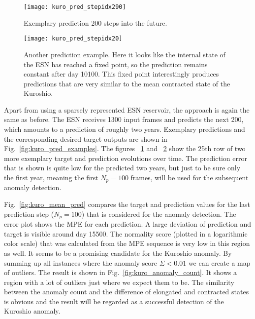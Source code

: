 \begin{figure}[p]
  \centering
  \texttt{[image: kuro\_pred\_stepidx290]}
  \caption{Exemplary prediction 200 steps into the future.}
  \label{fig:kuro_pred_stepidx290}
\end{figure}

\begin{figure}[p]
  \centering
  \texttt{[image: kuro\_pred\_stepidx20]}
  \caption{Another prediction example. Here it looks like the internal state of
  the ESN has reached a fixed point, so the prediction remains constant after
  day 10100.  This fixed point interestingly produces predictions that are very
  similar to the mean contracted state of the Kuroshio.}
  \label{fig:kuro_pred_stepidx20}
\end{figure}



Apart from using a sparsely represented ESN reservoir, the approach is again
the same as before.  The ESN receives 1300 input frames and predicts the next
200, which amounts to a prediction of roughly two years. Exemplary predictions
and the corresponding desired target outputs are shown in
Fig.~\ref{fig:kuro_pred_examples}. The figures ~\ref{fig:kuro_pred_stepidx290}
and ~\ref{fig:kuro_pred_stepidx20} show the 25th row of two more exemplary
target and prediction evolutions over time. The prediction error that is shown
is quite low for the predicted two years, but just to be sure only the first
year, meaning the first $N_p = 100$ frames, will be used for the subsequent
anomaly detection.

Fig.~\ref{fig:kuro_mean_pred} compares the target and prediction values for the
last prediction step ($N_p=100$) that is considered for the anomaly detection.
The error plot shows the MPE for each prediction. A large deviation of
prediction and target is visible around day 15500. The normality score (plotted
in a logarithmic color scale) that was calculated from the MPE sequence is very
low in this region as well. It seems to be a promising candidate for the
Kuroshio anomaly. By summing up all instances where the anomaly score $\Sigma <
0.01$ we can create a map of outliers. The result is shown in
Fig.~\ref{fig:kuro_anomaly_count}.  It shows a region with a lot of outliers
just where we expect them to be.  The similarity between the anomaly count and
the difference of elongated and contracted states is obvious and the result
will be regarded as a successful detection of the Kuroshio anomaly.

